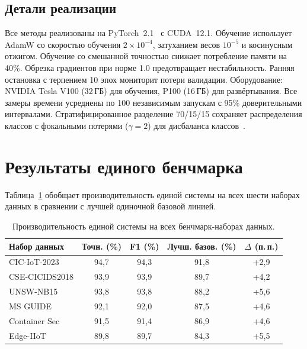\subsection{Детали реализации}

Все методы реализованы на PyTorch~2.1~\cite{Paszke2019} с CUDA~12.1. Обучение использует AdamW со скоростью обучения $2\times10^{-4}$, затуханием весов $10^{-5}$ и косинусным отжигом. Обучение со смешанной точностью снижает потребление памяти на 40\%. Обрезка градиентов при норме 1.0 предотвращает нестабильность. Ранняя остановка с терпением 10 эпох мониторит потери валидации. Оборудование: NVIDIA Tesla V100 (32\,ГБ) для обучения, P100 (16\,ГБ) для развёртывания. Все замеры времени усреднены по 100 независимым запускам с 95\% доверительными интервалами. Стратифицированное разделение 70/15/15 сохраняет распределения классов с фокальными потерями ($\gamma=2$) для дисбаланса классов~\cite{Lin2017focal}.


\section{Результаты единого бенчмарка}
\label{sec:benchmark_results}

Таблица~\ref{tab:unified_results} обобщает производительность единой системы на всех шести наборах данных в сравнении с лучшей одиночной базовой линией.

\begin{table}[htbp]
\centering
\caption{Производительность единой системы на всех бенчмарк-наборах данных.}
\label{tab:unified_results}
\begin{tabular}{lcccc}
\toprule
\textbf{Набор данных} & \textbf{Точн. (\%)} & \textbf{F1 (\%)} & \textbf{Лучш. базов. (\%)} & \textbf{$\Delta$ (п.\,п.)} \\
\midrule
CIC-IoT-2023    & 94,7 & 94,3 & 91,8 & +2,9 \\
CSE-CICIDS2018   & 93,9 & 93,9 & 89,7 & +4,2 \\
UNSW-NB15        & 93,8 & 93,8 & 88,2 & +5,6 \\
MS GUIDE         & 92,1 & 92,0 & 87,5 & +4,6 \\
Container Sec    & 91,5 & 91,4 & 86,9 & +4,6 \\
Edge-IIoT        & 89,8 & 89,7 & 84,3 & +5,5 \\
\bottomrule
\end{tabular}
\end{table}

